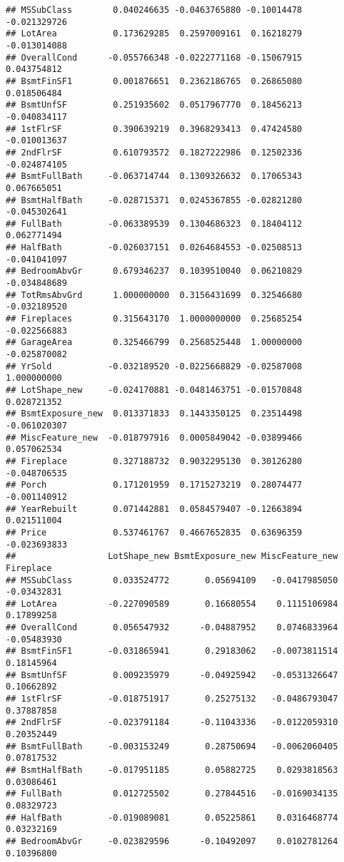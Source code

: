 \documentclass[]{article}
\begin{document}
\begin{verbatim}
## MSSubClass        0.040246635 -0.0463765880 -0.10014478 -0.021329726
## LotArea           0.173629285  0.2597009161  0.16218279 -0.013014088
## OverallCond      -0.055766348 -0.0222771168 -0.15067915  0.043754812
## BsmtFinSF1        0.001876651  0.2362186765  0.26865080  0.018506484
## BsmtUnfSF         0.251935602  0.0517967770  0.18456213 -0.040834117
## 1stFlrSF          0.390639219  0.3968293413  0.47424580 -0.010013637
## 2ndFlrSF          0.610793572  0.1827222986  0.12502336 -0.024874105
## BsmtFullBath     -0.063714744  0.1309326632  0.17065343  0.067665051
## BsmtHalfBath     -0.028715371  0.0245367855 -0.02821280 -0.045302641
## FullBath         -0.063389539  0.1304686323  0.18404112  0.062771494
## HalfBath         -0.026037151  0.0264684553 -0.02508513 -0.041041097
## BedroomAbvGr      0.679346237  0.1039510040  0.06210829 -0.034848689
## TotRmsAbvGrd      1.000000000  0.3156431699  0.32546680 -0.032189520
## Fireplaces        0.315643170  1.0000000000  0.25685254 -0.022566883
## GarageArea        0.325466799  0.2568525448  1.00000000 -0.025870082
## YrSold           -0.032189520 -0.0225668829 -0.02587008  1.000000000
## LotShape_new     -0.024170881 -0.0481463751 -0.01570848  0.028721352
## BsmtExposure_new  0.013371833  0.1443350125  0.23514498 -0.061020307
## MiscFeature_new  -0.018797916  0.0005849042 -0.03899466  0.057062534
## Fireplace         0.327188732  0.9032295130  0.30126280 -0.048706535
## Porch             0.171201959  0.1715273219  0.28074477 -0.001140912
## YearRebuilt       0.071442881  0.0584579407 -0.12663894  0.021511004
## Price             0.537461767  0.4667652835  0.63696359 -0.023693833
##                  LotShape_new BsmtExposure_new MiscFeature_new   Fireplace
## MSSubClass        0.033524772       0.05694109   -0.0417985050 -0.03432831
## LotArea          -0.227090589       0.16680554    0.1115106984  0.17899258
## OverallCond       0.056547932      -0.04887952    0.0746833964 -0.05483930
## BsmtFinSF1       -0.031865941       0.29183062   -0.0073811514  0.18145964
## BsmtUnfSF         0.009235979      -0.04925942   -0.0531326647  0.10662892
## 1stFlrSF         -0.018751917       0.25275132   -0.0486793047  0.37887858
## 2ndFlrSF         -0.023791184      -0.11043336   -0.0122059310  0.20352449
## BsmtFullBath     -0.003153249       0.28750694   -0.0062060405  0.07817532
## BsmtHalfBath     -0.017951185       0.05882725    0.0293818563  0.03086461
## FullBath          0.012725502       0.27844516   -0.0169034135  0.08329723
## HalfBath         -0.019089081       0.05225861    0.0316468774  0.03232169
## BedroomAbvGr     -0.023829596      -0.10492097    0.0102781264  0.10396800

\end{verbatim}
\end{document}
